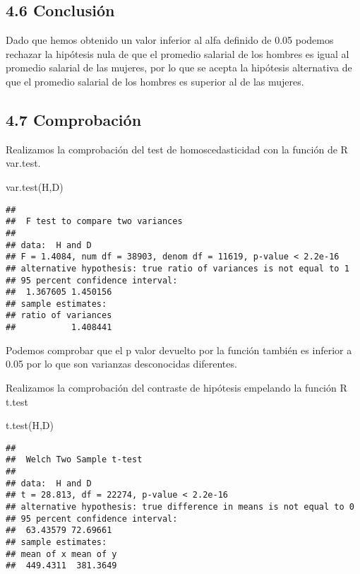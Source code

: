 \documentclass[
  a4paper]{article}
\newenvironment{Shaded}{\begin{snugshade}}{\end{snugshade}}
\newcommand{\FunctionTok}[1]{\textcolor[rgb]{0.00,0.00,0.00}{#1}}
\newcommand{\NormalTok}[1]{#1}
\begin{document}
\hypertarget{conclusiuxf3n-1}{%
\subsection{4.6 Conclusión}\label{conclusiuxf3n-1}}

Dado que hemos obtenido un valor inferior al alfa definido de 0.05
podemos rechazar la hipótesis nula de que el promedio salarial de los
hombres es igual al promedio salarial de las mujeres, por lo que se
acepta la hipótesis alternativa de que el promedio salarial de los
hombres es superior al de las mujeres.

\hypertarget{comprobaciuxf3n-1}{%
\subsection{4.7 Comprobación}\label{comprobaciuxf3n-1}}

Realizamos la comprobación del test de homoscedasticidad con la función
de R var.test.

\begin{Shaded}
\begin{Highlighting}[]
\FunctionTok{var.test}\NormalTok{(H,D)}
\end{Highlighting}
\end{Shaded}

\begin{verbatim}
## 
##  F test to compare two variances
## 
## data:  H and D
## F = 1.4084, num df = 38903, denom df = 11619, p-value < 2.2e-16
## alternative hypothesis: true ratio of variances is not equal to 1
## 95 percent confidence interval:
##  1.367605 1.450156
## sample estimates:
## ratio of variances 
##           1.408441
\end{verbatim}

Podemos comprobar que el p valor devuelto por la función también es
inferior a 0.05 por lo que son varianzas desconocidas diferentes.

Realizamos la comprobación del contraste de hipótesis empelando la
función R t.test

\begin{Shaded}
\begin{Highlighting}[]
\FunctionTok{t.test}\NormalTok{(H,D)}
\end{Highlighting}
\end{Shaded}

\begin{verbatim}
## 
##  Welch Two Sample t-test
## 
## data:  H and D
## t = 28.813, df = 22274, p-value < 2.2e-16
## alternative hypothesis: true difference in means is not equal to 0
## 95 percent confidence interval:
##  63.43579 72.69661
## sample estimates:
## mean of x mean of y 
##  449.4311  381.3649
\end{verbatim}
\end{document}
